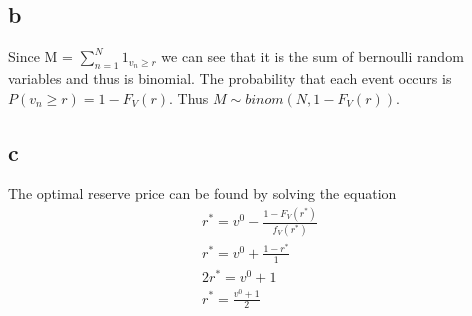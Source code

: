 \documentclass[10pt]{paper}
\begin{document}
\subsection*{b}

Since M = $\sum_{n=1}^N 1_{v_n \geq r}$ we can see that it is the sum of
bernoulli random variables and thus is binomial. The probability that each event
occurs is $P(v_n \geq r ) = 1 - F_V(r ).$ Thus $M \sim binom( N, 1- F_V(r) )$.

\subsection*{c}
The optimal reserve price can be found by solving the equation
\begin{align*}
  r^* = v^0 - \frac{1-F_V(r^*)}{f_V(r^*)}\\
  r^* =v^0 + \frac{1-r^*}{1}\\
  2r^* = v^0 + 1\\
  r^* = \frac{v^0 + 1}{2}\\
\end{align*}
\end{document}
